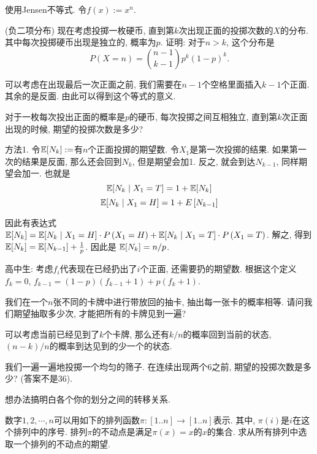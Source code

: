 \begin{solution*}
    使用Jensen不等式. 令$f(x):=x^n$. 
\end{solution*}

\begin{exercise}
    (负二项分布) 现在考虑投掷一枚硬币, 直到第$k$次出现正面的投掷次数的$X$的分布. 其中每次投掷硬币出现是独立的, 概率为$p$. 证明: 对于$n>k$, 这个分布是
    $$
    P(X=n) = \binom{n-1}{k-1}p^k(1-p)^k.
    $$
\end{exercise}

\begin{solution*}
    可以考虑在出现最后一次正面之前, 我们需要在$n-1$个空格里面插入$k-1$个正面. 其余的是反面. 由此可以得到这个等式的意义. 
\end{solution*}

\begin{exercise}
    对于一枚每次投出正面的概率是$p$的硬币, 每次投掷之间互相独立, 直到第$k$次正面出现的时候, 期望的投掷次数是多少? 
\end{exercise}

\begin{solution*}

    方法1. 令$\mathbb E[N_k]:=$有$n$个正面投掷的期望数. 令$X_1$是第一次投掷的结果. 如果第一次的结果是反面, 那么还会回到$N_k$, 但是期望会加1. 反之, 就会到达$N_{k-1}$, 同样期望会加一. 也就是
    $$
\mathbb E[N_k \mid X_1=T]=1+\mathbb E[N_k]
$$
$$
\mathbb E[N_k \mid X_1=H]=1+E\left[N_{k-1}\right]
$$

因此有表达式$\mathbb E[N_k]=\mathbb E[N_k \mid X_1=H] \cdot P\left(X_1=H\right)+\mathbb E[N_k \mid X_1=T] \cdot P\left(X_1=T\right)$. 解之, 得到$\mathbb E[N_k]=\mathbb E[N_{k-1}]+\frac{1}{p}$. 因此是 $\mathbb E[N_k]=n/p$.

    高中生: 考虑$f_i$代表现在已经扔出了$i$个正面, 还需要扔的期望数. 根据这个定义$f_k=0$, $f_{k-1}=(1-p)(f_{k-1}+1)+p(f_k+1)$. 

\end{solution*}


\begin{exercise}
    我们在一个$n$张不同的卡牌中进行带放回的抽卡, 抽出每一张卡的概率相等. 请问我们期望抽取多少次, 才能把所有的卡牌见到一遍? 
\end{exercise}

\begin{solution*}
    可以考虑当前已经见到了$k$个卡牌, 那么还有$k/n$的概率回到当前的状态, $(n-k)/n$的概率到达见到的少一个的状态. 
\end{solution*}

\begin{exercise}
    我们一遍一遍地投掷一个均匀的筛子. 在连续出现两个6之前, 期望的投掷次数是多少? (答案不是36).
\end{exercise}
\begin{solution*}
    想办法搞明白各个你的划分之间的转移关系. 
\end{solution*}


\begin{exercise}
     数字$1,2,\cdots, n$可以用如下的排列函数$\pi:[1..n] \to [1..n]$表示. 其中, $\pi(i)$是$i$在这个排列中的序号. 排列$\pi$的不动点是满足$\pi(x)=x$的$x$的集合. 求从所有排列中选取一个排列的不动点的期望. 
\end{exercise}


